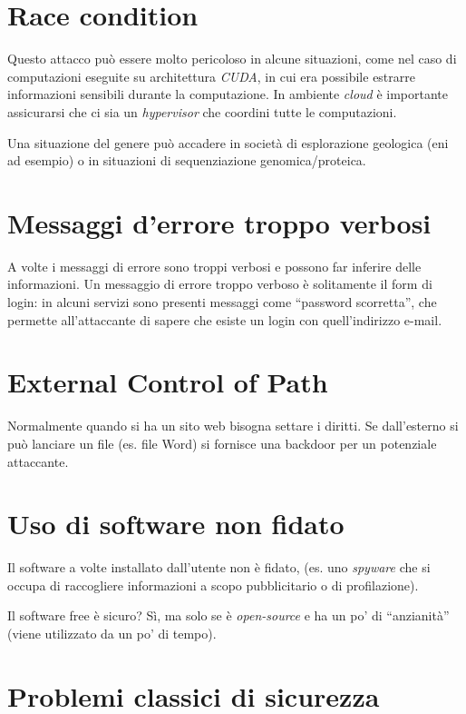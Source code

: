 \section{Race condition}

Questo attacco può essere molto pericoloso in alcune situazioni, come nel caso
di computazioni eseguite su architettura \textit{CUDA}, in cui era
possibile estrarre informazioni sensibili durante la computazione. In ambiente
\textit{cloud} è importante assicurarsi che ci sia un \textit{hypervisor} che
coordini tutte le computazioni.

Una situazione del genere può accadere in società di esplorazione geologica (eni
ad esempio) o in situazioni di sequenziazione genomica/proteica.

\section{Messaggi d'errore troppo verbosi}

A volte i messaggi di errore sono troppi verbosi e possono far inferire delle
informazioni. Un messaggio di errore troppo verboso è solitamente il form di
login: in alcuni servizi sono presenti messaggi come ``password scorretta'', che
permette all'attaccante di sapere che esiste un login con quell'indirizzo
e-mail.

\section{External Control of Path}

Normalmente quando si ha un sito web bisogna settare i diritti. Se dall'esterno
si può lanciare un file (es. file Word) si fornisce una backdoor per un
potenziale attaccante.

\section{Uso di software non fidato}

Il software a volte installato dall'utente non è fidato, (es. uno
\textit{spyware} che si occupa di raccogliere informazioni a scopo pubblicitario
o di profilazione).

Il software free è sicuro? Sì, ma solo se è \textit{open-source} e ha un po' di
``anzianità'' (viene utilizzato da un po' di tempo).

\section{Problemi classici di sicurezza}

